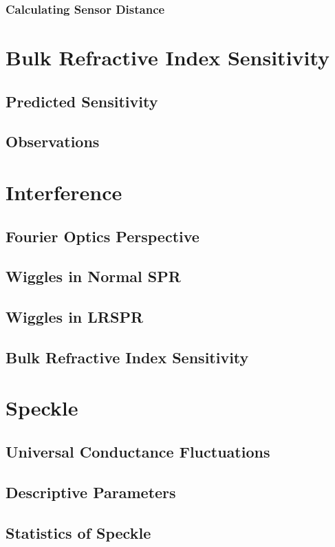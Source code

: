 \documentclass[a4paper,titlepage,onecolumn]{report}
\begin{document}
  \subsection{Calculating Sensor Distance}

\chapter{Bulk Refractive Index Sensitivity} \label{ch:bulkri}
 \section{Predicted Sensitivity}
 \section{Observations}

\chapter{Interference} \label{ch:interference}
 \section{Fourier Optics Perspective}
 \section{Wiggles in Normal SPR}
 \section{Wiggles in LRSPR}
 \section{Bulk Refractive Index Sensitivity}

\chapter{Speckle} \label{ch:speckle}
 \section{Universal Conductance Fluctuations}
 \section{Descriptive Parameters}
 \section{Statistics of Speckle}
\end{document}
